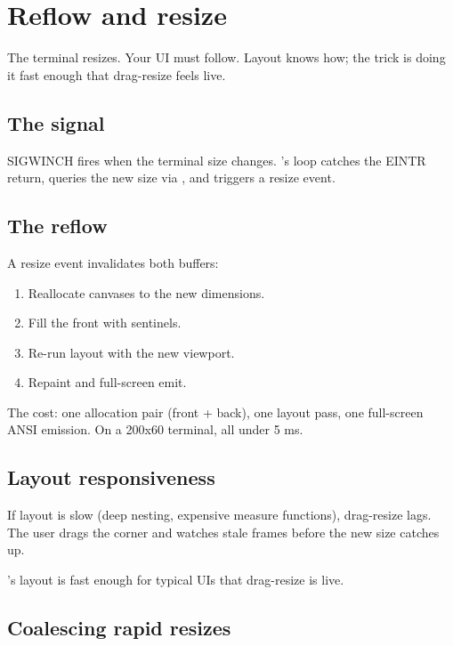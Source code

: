 \chapter{Reflow and resize}
\label{ch:reflow}

\begin{aside}
The terminal resizes. Your UI must follow. Layout knows how;
the trick is doing it fast enough that drag-resize feels live.
\end{aside}

\section{The signal}

SIGWINCH fires when the terminal size changes. \maya{}'s
loop catches the EINTR return, queries the new size via
, and triggers a resize event.

\section{The reflow}

A resize event invalidates both buffers:

\begin{enumerate}[leftmargin=*]
  \item Reallocate canvases to the new dimensions.
  \item Fill the front with sentinels.
  \item Re-run layout with the new viewport.
  \item Repaint and full-screen emit.
\end{enumerate}

The cost: one allocation pair (front + back), one layout
pass, one full-screen ANSI emission. On a 200x60 terminal,
all under 5 ms.

\section{Layout responsiveness}

If layout is slow (deep nesting, expensive measure
functions), drag-resize lags. The user drags the corner and
watches stale frames before the new size catches up.

\maya{}'s layout is fast enough for typical UIs that
drag-resize is live.

\section{Coalescing rapid resizes}

